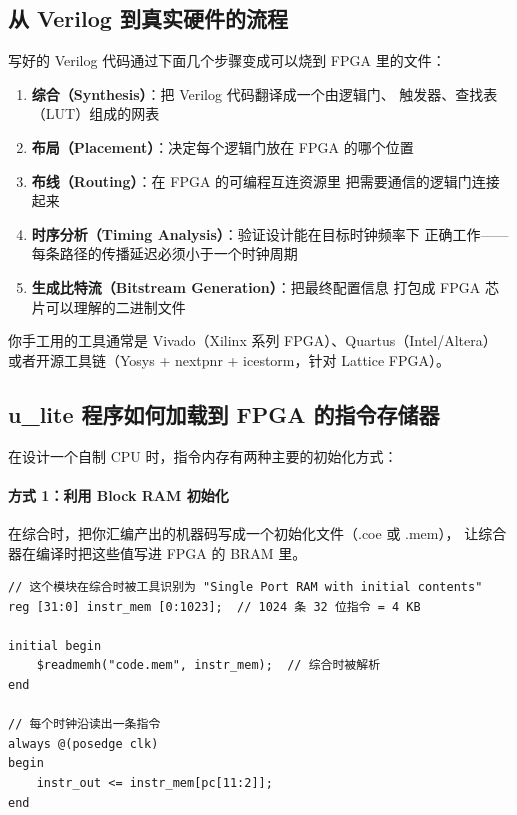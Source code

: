 \subsection{从 Verilog 到真实硬件的流程}

写好的 Verilog 代码通过下面几个步骤变成可以烧到 FPGA 里的文件：

\begin{enumerate}
    \item \textbf{综合（Synthesis）}：把 Verilog 代码翻译成一个由逻辑门、
        触发器、查找表（LUT）组成的网表
    \item \textbf{布局（Placement）}：决定每个逻辑门放在 FPGA 的哪个位置
    \item \textbf{布线（Routing）}：在 FPGA 的可编程互连资源里
        把需要通信的逻辑门连接起来
    \item \textbf{时序分析（Timing Analysis）}：验证设计能在目标时钟频率下
        正确工作——每条路径的传播延迟必须小于一个时钟周期
    \item \textbf{生成比特流（Bitstream Generation）}：把最终配置信息
        打包成 FPGA 芯片可以理解的二进制文件
\end{enumerate}

你手工用的工具通常是 Vivado（Xilinx 系列 FPGA）、Quartus（Intel/Altera）
或者开源工具链（Yosys + nextpnr + icestorm，针对 Lattice FPGA）。

\subsection{u\_lite 程序如何加载到 FPGA 的指令存储器}

在设计一个自制 CPU 时，指令内存有两种主要的初始化方式：

\paragraph{方式 1：利用 Block RAM 初始化}
在综合时，把你汇编产出的机器码写成一个初始化文件（.coe 或 .mem），
让综合器在编译时把这些值写进 FPGA 的 BRAM 里。

\begin{lstlisting}[style=verilog,caption=BRAM 里嵌入机器码的模板]
// 这个模块在综合时被工具识别为 "Single Port RAM with initial contents"
reg [31:0] instr_mem [0:1023];  // 1024 条 32 位指令 = 4 KB

initial begin
    $readmemh("code.mem", instr_mem);  // 综合时被解析
end

// 每个时钟沿读出一条指令
always @(posedge clk)
begin
    instr_out <= instr_mem[pc[11:2]];
end
\end{lstlisting}

